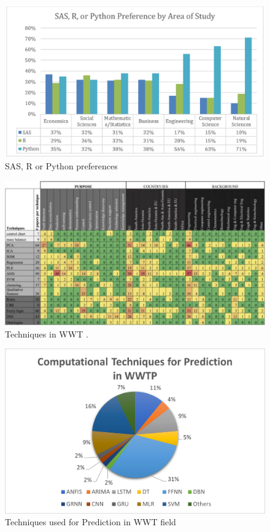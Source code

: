

\begin{figure}[h]
\centering
\includegraphics[width=\linewidth]{figures/Ch3/BigDataTools.pdf}
\caption{SAS, R or Python preferences \cite{Siddiqui2015}}
\label{f:soft-preferences}
\end{figure}

\begin{figure}[h]
\centering
\includegraphics[width=0.9\linewidth]{figures/Ch3/PaperTable.pdf}
\caption{Techniques in WWT  \cite{Corominas2018}.}
\label{f:Papers Table}
\end{figure}

\begin{figure}[h]
\centering
\includegraphics[width=0.8\linewidth]{figures/Ch3/Prediction_model_dist.pdf}
\caption{Techniques used for Prediction in WWT field}
\label{f:techniques-prediction}
\end{figure}

